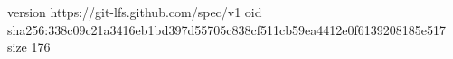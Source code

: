 version https://git-lfs.github.com/spec/v1
oid sha256:338c09c21a3416eb1bd397d55705c838cf511cb59ea4412e0f6139208185e517
size 176
